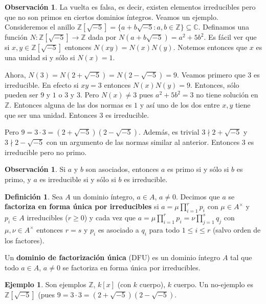 \documentclass[12pt]{book}
\theoremstyle{definition}
\newtheorem{obs}[teo]{Observación}
\newtheorem{defn}[teo]{Definición}
\newtheorem{ex}[teo]{Ejemplo}
\newcommand{\CC}{\mathbb{C}}
\newcommand{\ZZ}{\mathbb{Z}}      %
\begin{document}
\begin{obs}
La vuelta es falsa, es decir, existen elementos irreducibles pero que no son primos en ciertos dominios íntegros. Veamos un ejemplo. Consideremos el anillo $\ZZ[\sqrt{-5}] = \{a+b\sqrt{-5}:a,b\in\ZZ\}\subseteq \CC$. Definamos una función $N:\ZZ[\sqrt{-5}]\to\ZZ$ dada por $N(a+b\sqrt{-5})=a^2 + 5b^2$. Es fácil ver que si $x,y\in\ZZ[\sqrt{-5}]$ entonces $N(xy)=N(x)N(y)$. Notemos entonces que $x$ es una unidad si y sólo si $N(x)=1$.

Ahora, $N(3)=N(2+\sqrt{-5})=N(2-\sqrt{-5})=9$. Veamos primero que $3$ es irreducible. En efecto si $xy=3$ entonces $N(x)N(y)=9$. Entonces, sólo pueden ser $9$ y $1$ o $3$ y $3$. Pero $N(x)\neq 3$ pues $a^2 + 5b^2 = 3$ no tiene solución en $\ZZ$. Entonces alguna de las dos normas es $1$ y así uno de los dos entre $x,y$ tiene que ser una unidad. Entonces $3$ es irreducible.

Pero $9=3\cdot 3 = (2+\sqrt{-5})(2-\sqrt{-5})$. Además, es trivial $3\nmid 2+\sqrt{-5}$ y $3\nmid 2-\sqrt{-5}$ con un argumento de las normas similar al anterior. Entonces $3$ es irreducible pero no primo.

\end{obs}

\begin{obs}
Si $a$ y $b$ son asociados, entonces $a$ es primo si y sólo si $b$ es primo, y $a$ es irreducible si y sólo si $b$ es irreducible.
\end{obs}

\begin{defn}
Sea $A$ un dominio íntegro, $a\in A$, $a\neq 0$. Decimos que $a$ se \textbf{factoriza en forma única por irreducibles} si $a=\mu \prod_{i=1}^r p_i$ con $\mu\in A^\times$ y $p_i\in A$ irreducibles ($r\geq 0$) y cada vez que $a=\mu \prod_{i=1}^r p_i = \nu \prod_{j=1}^s q_j$ con $\mu,\nu\in A^\times$ entonces $r=s$ y $p_i$ es asociado a $q_i$ para todo $1\leq i\leq r$ (salvo orden de los factores).

Un \textbf{dominio de factorización única} (DFU) es un dominio íntegro $A$ tal que todo $a\in A$, $a\neq 0$ se factoriza en forma única por irreducibles.
\end{defn}

\begin{ex}
Son ejemplos $\ZZ$, $k[x]$ (con $k$ cuerpo), $k$ cuerpo. Un no-ejemplo es $\ZZ[\sqrt{-5}]$ (pues $9=3\cdot 3 = (2+\sqrt{-5})(2-\sqrt{-5})$.
\end{ex}
\end{document}
